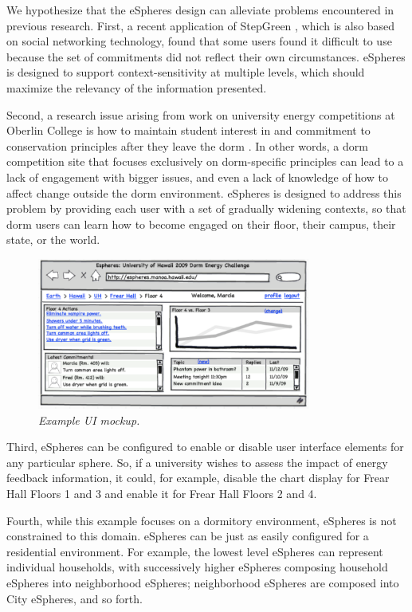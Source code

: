 We hypothesize that the eSpheres design can alleviate problems
encountered in previous research.  First, a recent application of StepGreen
\cite{Grevet10}, which is also based on social networking technology, found
that some users found it difficult to use because the set of commitments
did not reflect their own circumstances.  eSpheres is designed to support
context-sensitivity at multiple levels, which should maximize the relevancy
of the information presented.

Second, a research issue arising from work on university energy
competitions at Oberlin College is how to maintain student interest in and
commitment to conservation principles after they leave the dorm
\cite{Peterson09}.  In other words, a dorm competition site that focuses
exclusively on dorm-specific principles can lead to a lack of engagement
with bigger issues, and even a lack of knowledge of how to affect change
outside the dorm environment.  eSpheres is designed to address this problem
by providing each user with a set of gradually widening contexts, so that
dorm users can learn how to become engaged on their floor, their campus,
their state, or the world.

\begin{figure}[th]
  \center
  \includegraphics[width=0.8\textwidth]{esphere-mockup.eps}
  \caption{\em \small Example UI mockup.}
 \label{fig:esphere-mockup}
\end{figure} 

Third, eSpheres can be configured to enable or disable user interface
elements for any particular sphere.  So, if a university wishes to assess
the impact of energy feedback information, it could, for example, disable
the chart display for Frear Hall Floors 1 and 3 and enable it for Frear
Hall Floors 2 and 4.

Fourth, while this example focuses on a dormitory environment, eSpheres is
not constrained to this domain.  eSpheres can be just as easily configured
for a residential environment.  For example, the lowest level eSpheres can
represent individual households, with successively higher eSpheres
composing household eSpheres into neighborhood eSpheres; neighborhood
eSpheres are composed into City eSpheres, and so forth.

